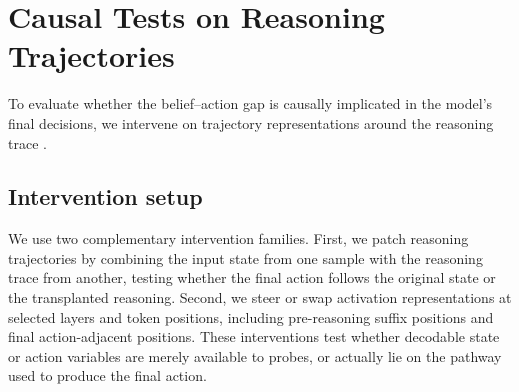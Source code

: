 \documentclass[10pt,twocolumn]{article}
\begin{document}

\section{Causal Tests on Reasoning Trajectories}
To evaluate whether the belief--action gap is causally implicated in the model's final decisions, we intervene on trajectory representations around the reasoning trace \cite{meng2022locating, kramar2024atpstar}.

\subsection{Intervention setup}
We use two complementary intervention families. First, we patch reasoning
trajectories by combining the input state from one sample with the reasoning
trace from another, testing whether the final action follows the original
state or the transplanted reasoning. Second, we steer or swap activation
representations at selected layers and token positions, including
pre-reasoning suffix positions and final action-adjacent positions. These
interventions test whether decodable state or action variables are merely
available to probes, or actually lie on the pathway used to produce the final
action.

\end{document}
